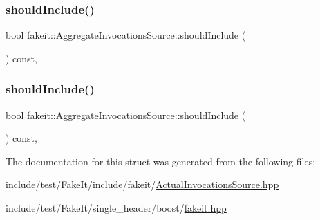 \mbox{\label{structfakeit_1_1AggregateInvocationsSource_a7e02b97ba9e4b12765d7d46420fab1e7}} 
\subsubsection{\texorpdfstring{shouldInclude()}{shouldInclude()}\hspace{0.1cm}{\footnotesize\ttfamily [8/9]}}
{\footnotesize\ttfamily bool fakeit\+::\+Aggregate\+Invocations\+Source\+::should\+Include (\begin{DoxyParamCaption}\item[{\mbox{\hyperlink{structfakeit_1_1Invocation}{fakeit\+::\+Invocation}} $\ast$}]{ }\end{DoxyParamCaption}) const\hspace{0.3cm}{\ttfamily [inline]}, {\ttfamily [protected]}}

\mbox{\label{structfakeit_1_1AggregateInvocationsSource_a7e02b97ba9e4b12765d7d46420fab1e7}} 
\subsubsection{\texorpdfstring{shouldInclude()}{shouldInclude()}\hspace{0.1cm}{\footnotesize\ttfamily [9/9]}}
{\footnotesize\ttfamily bool fakeit\+::\+Aggregate\+Invocations\+Source\+::should\+Include (\begin{DoxyParamCaption}\item[{\mbox{\hyperlink{structfakeit_1_1Invocation}{fakeit\+::\+Invocation}} $\ast$}]{ }\end{DoxyParamCaption}) const\hspace{0.3cm}{\ttfamily [inline]}, {\ttfamily [protected]}}



The documentation for this struct was generated from the following files\+:\begin{DoxyCompactItemize}
\item 
include/test/\+Fake\+It/include/fakeit/\mbox{\hyperlink{ActualInvocationsSource_8hpp}{Actual\+Invocations\+Source.\+hpp}}\item 
include/test/\+Fake\+It/single\+\_\+header/boost/\mbox{\hyperlink{single__header_2boost_2fakeit_8hpp}{fakeit.\+hpp}}\end{DoxyCompactItemize}
